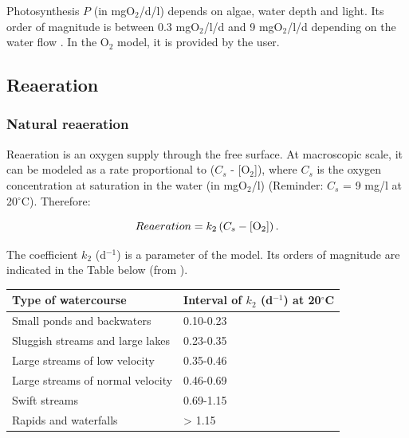 Photosynthesis $P$ (in mgO$_2$/d/l) depends on algae, water depth and light.
Its order of magnitude is between 0.3 mgO$_2$/l/d and 9 mgO$_2$/l/d
depending on the water flow \cite{streeter_ohio_1925}.
In the O$_2$ model, it is provided by the user.

\subsection{Reaeration}

\subsubsection{Natural reaeration}

Reaeration is an oxygen supply through the free surface.
At macroscopic scale, it can be modeled as a rate proportional to ($C_s$ - [O$_2$]),
where $C_s$ is the oxygen concentration at saturation in the water (in mgO$_2$/l)
(Reminder: $C_s$ = 9 mg/l at 20$^{\circ}$C). Therefore:

\begin{equation}
  Reaeration = k_2 \left( C_s - [\rm{O}_2] \right).
\end{equation}

The coefficient $k_2$ (d$^{-1}$) is a parameter of the model.
Its orders of magnitude are indicated in the Table below
(from \cite{tchobanoglous_wq_1985}).\\

\begin{table}[H]
 			\centering
\begin{tabular}{p{3.0in}p{3.0in}}
\hline
\multicolumn{1}{|p{3.0in}}{Type of watercourse} & 
\multicolumn{1}{|p{3.0in}|}{Interval of $k_2$ (d$^{-1}$) at 20$^{\circ}$C} \\
\hline
\multicolumn{1}{|p{3.0in}}{Small ponds and backwaters} & 
\multicolumn{1}{|p{3.0in}|}{0.10-0.23} \\
\hline
\multicolumn{1}{|p{3.0in}}{Sluggish streams and large lakes} & 
\multicolumn{1}{|p{3.0in}|}{0.23-0.35} \\
\hline
\multicolumn{1}{|p{3.0in}}{Large streams of low velocity} & 
\multicolumn{1}{|p{3.0in}|}{0.35-0.46} \\
\hline
\multicolumn{1}{|p{3.0in}}{Large streams of normal velocity} & 
\multicolumn{1}{|p{3.0in}|}{0.46-0.69} \\
\hline
\multicolumn{1}{|p{3.0in}}{Swift streams} & 
\multicolumn{1}{|p{3.0in}|}{0.69-1.15} \\
\hline
\multicolumn{1}{|p{3.0in}}{Rapids and waterfalls} & 
\multicolumn{1}{|p{3.0in}|}{> 1.15} \\
\hline

\end{tabular}
\end{table}

